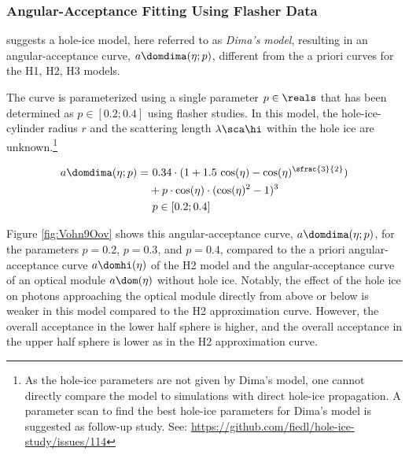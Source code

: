 \subsubsection{Angular-Acceptance Fitting Using Flasher Data}
\label{sec:dimas_model}

%
%
%
%
%
\chirkin \cite{flasherdataderivedicemodels} suggests a hole-ice model, here referred to as \textit{Dima's model}, resulting in an angular-acceptance curve, $a\domdima(\eta;p)$, different from the a priori curves for the H1, H2, H3 models.

The curve is parameterized using a single parameter $p\in\reals$ that has been determined as $p \in [0.2;0.4]$ using flasher studies. \cite{msuforwardholeice} In this model, the hole-ice-cylinder radius $r$ and the scattering length $\lambda\sca\hi$ within the hole ice are unknown.\footnote{As the hole-ice parameters are not given by Dima's model, one cannot directly compare the model to \clsim simulations with direct hole-ice propagation. A parameter scan to find the best hole-ice parameters for Dima's model is suggested as follow-up study. See: \url{https://github.com/fiedl/hole-ice-study/issues/114} \followup}

\begin{align}
  a\domdima(\eta;p) = & \ 0.34 \cdot (1 + 1.5\,\cos(\eta) - \cos(\eta)^{\sfrac{3}{2}}) \nonumber \\
      & + p \cdot \cos(\eta) \cdot  (\cos(\eta)^2 - 1)^3 \\
      & \ p \in [0.2;0.4] \nonumber
  \label{eq:adima}
\end{align}

Figure \ref{fig:Vohn9Oov} shows this angular-acceptance curve, $a\domdima(\eta;p)$, for the parameters $p=0.2$, $p=0.3$, and $p=0.4$, compared to the a priori angular-acceptance curve $a\domhi(\eta)$ of the H2 model and the angular-acceptance curve of an optical module $a\dom(\eta)$ without hole ice.
Notably, the effect of the hole ice on photons approaching the optical module directly from above or below is weaker in this model compared to the H2 approximation curve. However, the overall acceptance in the lower half sphere is higher, and the overall acceptance in the upper half sphere is lower as in the H2 approximation curve.


